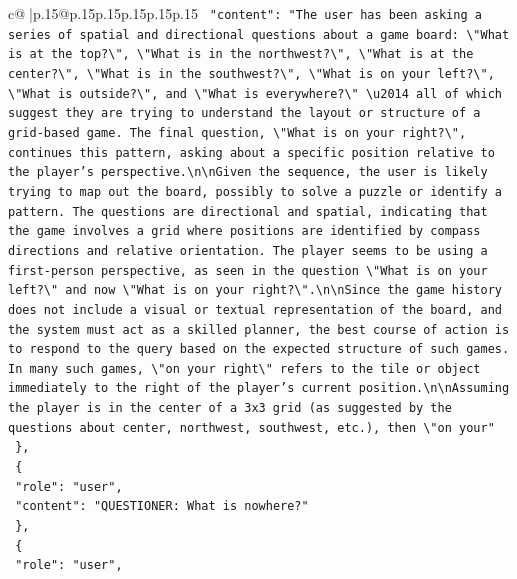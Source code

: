 \documentclass{article}
\begin{document}
{\begin{supertabular}{c@{$\;$}|p{.15\linewidth}@{}p{.15\linewidth}p{.15\linewidth}p{.15\linewidth}p{.15\linewidth}p{.15\linewidth}}
{{{\texttt{    "content": "The user has been asking a series of spatial and directional questions about a game board: \textbackslash{}"What is at the top?\textbackslash{}", \textbackslash{}"What is in the northwest?\textbackslash{}", \textbackslash{}"What is at the center?\textbackslash{}", \textbackslash{}"What is in the southwest?\textbackslash{}", \textbackslash{}"What is on your left?\textbackslash{}", \textbackslash{}"What is outside?\textbackslash{}", and \textbackslash{}"What is everywhere?\textbackslash{}" \textbackslash{}u2014 all of which suggest they are trying to understand the layout or structure of a grid{-}based game. The final question, \textbackslash{}"What is on your right?\textbackslash{}", continues this pattern, asking about a specific position relative to the player's perspective.\textbackslash{}n\textbackslash{}nGiven the sequence, the user is likely trying to map out the board, possibly to solve a puzzle or identify a pattern. The questions are directional and spatial, indicating that the game involves a grid where positions are identified by compass directions and relative orientation. The player seems to be using a first{-}person perspective, as seen in the question \textbackslash{}"What is on your left?\textbackslash{}" and now \textbackslash{}"What is on your right?\textbackslash{}".\textbackslash{}n\textbackslash{}nSince the game history does not include a visual or textual representation of the board, and the system must act as a skilled planner, the best course of action is to respond to the query based on the expected structure of such games. In many such games, \textbackslash{}"on your right\textbackslash{}" refers to the tile or object immediately to the right of the player's current position.\textbackslash{}n\textbackslash{}nAssuming the player is in the center of a 3x3 grid (as suggested by the questions about center, northwest, southwest, etc.), then \textbackslash{}"on your"} \\
\texttt{  \},} \\
\texttt{  \{} \\
\texttt{    "role": "user",} \\
\texttt{    "content": "QUESTIONER: What is nowhere?"} \\
\texttt{  \},} \\
\texttt{  \{} \\
\texttt{    "role": "user",} \\
}}}
\end{supertabular}}
\end{document}
